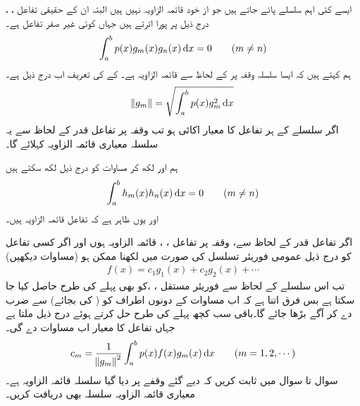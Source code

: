 ایسے کئی اہم سلسلے پائے جاتے ہیں جو از خود قائمہ الزاویہ نہیں ہیں البتہ ان کے حقیقی تفاعل ، ،   درج ذیل پر پورا اترتے ہیں جہاں  کوئی غیر صفر تفاعل ہے۔
\begin{align}\label{مساوات_طاقتی_اضافی_عمودی_تفاعل_قدر_الف}
\int_{a}^{b} p(x) g_m(x)g_n(x)\dif x=0\quad \quad (m\ne n)
\end{align}  
ہم کہتے ہیں کہ ایسا سلسلہ وقفہ  پر   کے لحاظ سے قائمہ الزاویہ ہے۔ کے  کی تعریف اب درج ذیل ہے۔
\begin{align}\label{مساوات_طاقتی_اضافی_معیار_قدر_تفاعل}
\norm{g_m}=\sqrt{\int_{a}^{b}p(x)g_m^2\dif x}
\end{align}
اگر سلسلے کے ہر تفاعل  کا معیار اکائی  ہو تب وقفہ  پر تفاعل قدر  کے لحاظ سے یہ سلسلہ معیاری قائمہ الزاویہ کہلائے گا۔

ہم  اور  لکھ کر مساوات  کو درج ذیل لکھ سکتے ہیں
\begin{align*}
\int_{a}^{b}h_m(x)h_n(x)\dif x=0 \quad \quad (m\ne n)
\end{align*}
اور یوں ظاہر ہے کہ  تفاعل قائمہ الزاویہ ہیں۔

اگر تفاعل قدر  کے لحاظ سے، وقفہ  پر تفاعل ، ،   قائمہ الزاویہ ہوں اور اگر کسی تفاعل  کو درج ذیل عمومی فوریئر تسلسل کی صورت میں لکھنا ممکن ہو (مساوات  دیکھیں)
\begin{align}\label{مساوات_ضمیمہ_اضافی_تفاعل_قدر_تسلسل_الف}
f(x)=c_1g_1(x)+c_2g_2(x)+\cdots
\end{align} 
 تب اس سلسلے کے لحاظ سے فوریئر مستقل ، ، کو بھی پہلے کی طرح حاصل کیا جا سکتا ہے بس فرق اتنا ہے کہ اب مساوات
  کے دونوں اطراف کو ( کی بجائے)  سے ضرب دے کر آگے بڑھا جائے گا۔باقی سب کچھ پہلے کی طرح حل کرتے ہوئے درج ذیل ملتا ہے جہاں تفاعل کا معیار اب مساوات  دے گی۔ 
\begin{align}\label{مساوات_ضمیمہ_اضافی_تفاعل_قدر_تسلسل_عددی_سر}
c_m=\frac{1}{\norm{g_m}^2}\int_{a}^{b}p(x)f(x)g_m(x)\dif x\quad \quad (m=1,2,\cdots)
\end{align} 
سوال  تا سوال  میں ثابت کریں کہ دیے گئے وقفے پر دیا گیا سلسلہ قائمہ الزاویہ ہے۔معیاری قائمہ الزاویہ سلسلہ بھی دریافت کریں۔

